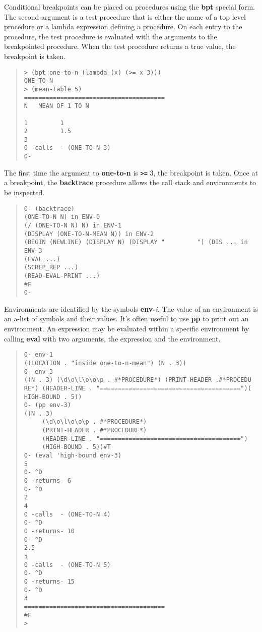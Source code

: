 \documentclass[10pt]{article}
\begin{document}
Conditional breakpoints can be placed on procedures using the
\textbf{bpt} special form.  The second argument is a test procedure
that is either the name of a top level procedure or a lambda
expression defining a procedure.  On each entry to the
procedure, the test procedure is evaluated with the arguments
to the breakpointed procedure.  When the test procedure
returns a true value, the breakpoint is taken.

\begin{quote}
\begin{verbatim}
> (bpt one-to-n (lambda (x) (>= x 3)))
ONE-TO-N
> (mean-table 5)
=======================================
N   MEAN OF 1 TO N

1         1
2         1.5
3
0 -calls  - (ONE-TO-N 3)
0-
\end{verbatim}
\end{quote}

The first time the argument to \textbf{one-to-n} is \textbf{\texttt{>=}} 3, the
breakpoint is taken.  Once at a breakpoint, the \textbf{backtrace}
procedure allows the call stack and environments to be
inspected.

\begin{quote}
\begin{verbatim}
0- (backtrace)
(ONE-TO-N N) in ENV-0
(/ (ONE-TO-N N) N) in ENV-1
(DISPLAY (ONE-TO-N-MEAN N)) in ENV-2
(BEGIN (NEWLINE) (DISPLAY N) (DISPLAY "         ") (DIS ... in ENV-3
(EVAL ...)
(SCREP_REP ...)
(READ-EVAL-PRINT ...)
#F
0-
\end{verbatim}
\end{quote}

Environments are identified by the symbols \textbf{env-}\emph{i}.
The value of an environment is an a-list of symbols and their
values. It's often useful to use \textbf{pp} to print out an
environment.  An expression may be evaluated within a specific
environment by calling \textbf{eval} with two arguments, the
expression and the environment.

\begin{quote}
\begin{verbatim}
0- env-1
((LOCATION . "inside one-to-n-mean") (N . 3))
0- env-3
((N . 3) (\d\o\l\o\o\p . #*PROCEDURE*) (PRINT-HEADER .#*PROCEDU
RE*) (HEADER-LINE . "=======================================")(
HIGH-BOUND . 5))
0- (pp env-3)
((N . 3)
     (\d\o\l\o\o\p . #*PROCEDURE*)
     (PRINT-HEADER . #*PROCEDURE*)
     (HEADER-LINE . "=======================================")
     (HIGH-BOUND . 5))#T
0- (eval 'high-bound env-3)
5
0- ^D
0 -returns- 6
0- ^D
2
4
0 -calls  - (ONE-TO-N 4)
0- ^D
0 -returns- 10
0- ^D
2.5
5
0 -calls  - (ONE-TO-N 5)
0- ^D
0 -returns- 15
0- ^D
3
=======================================
#F
>
\end{verbatim}
\end{quote}
\end{document}
